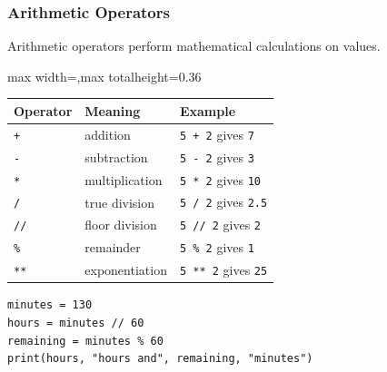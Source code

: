 \documentclass[aspectratio=169,10pt]{beamer}
\begin{document}
\begin{frame}[fragile]
\frametitle{Arithmetic Operators}
\begin{tcolorbox}[lecturebox,title=Key idea]
Arithmetic operators perform mathematical calculations on values.
\end{tcolorbox}

\small
\begin{adjustbox}{max width=\textwidth,max totalheight=0.36\textheight}
\begin{tabular}{@{}p{1.5cm}p{4.1cm}p{5.5cm}@{}}
\toprule
\textbf{Operator} & \textbf{Meaning} & \textbf{Example} \\
\midrule
\texttt{+} & addition & \texttt{5 + 2} gives \texttt{7} \\
\texttt{-} & subtraction & \texttt{5 - 2} gives \texttt{3} \\
\texttt{*} & multiplication & \texttt{5 * 2} gives \texttt{10} \\
\texttt{/} & true division & \texttt{5 / 2} gives \texttt{2.5} \\
\texttt{//} & floor division & \texttt{5 // 2} gives \texttt{2} \\
\texttt{\%} & remainder & \texttt{5 \% 2} gives \texttt{1} \\
\texttt{**} & exponentiation & \texttt{5 ** 2} gives \texttt{25} \\
\bottomrule
\end{tabular}
\end{adjustbox}

\begin{lstlisting}[style=pycodesmall]
minutes = 130
hours = minutes // 60
remaining = minutes % 60
print(hours, "hours and", remaining, "minutes")
\end{lstlisting}
\end{frame}
\end{document}
